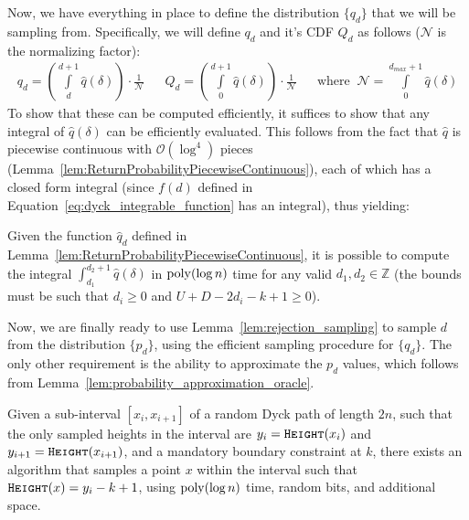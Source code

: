 Now, we have everything in place to define the distribution $\{ q_d\}$ that we will be sampling from.
Specifically, we will define $q_d$ and it's CDF $Q_d$ as follows ($\mathcal N$ is the normalizing factor):
{\small
    \begin{align}
        q_d = \left(\int\limits_d^{d+1} \hat q(\delta)\right)\cdot \frac{1}{\mathcal N}
        && Q_d = \left(\int\limits_0^{d+1} \hat q(\delta)\right)\cdot \frac{1}{\mathcal N}
        && \textrm{where }\ \mathcal N = \int\limits_0^{d_{max}+1} \hat q(\delta)
    \end{align}}
To show that these can be computed efficiently, it suffices to show that any integral of $\hat q(\delta)$ can be efficiently evaluated.
This follows from the fact that $\hat q$ is piecewise continuous with $\mathcal O(\log^4)$ pieces (Lemma~\ref{lem:ReturnProbabilityPiecewiseContinuous}),
each of which has a closed form integral (since $f(d)$ defined in Equation~\ref{eq:dyck_integrable_function} has an integral), thus yielding:
\begin{lemma}
\label{lem:ReturnProbabilityPiecewiseContinuousIntegral}
Given the function $\hat q_d$ defined in Lemma~\ref{lem:ReturnProbabilityPiecewiseContinuous},
it is possible to compute the integral $\int_{d_1}^{d_2+1} \hat q(\delta)$ in $\mathrm{poly}(\log n)$ time for any valid $d_1, d_2\in \mathbb Z$
(the bounds must be such that $d_i \ge 0$ and $U+D-2d_i-k+1 \ge 0$).
\end{lemma}

Now, we are finally ready to use Lemma~\ref{lem:rejection_sampling} to sample $d$ from the distribution $\{p_d\}$,
using the efficient sampling procedure for $\{q_d\}$.
The only other requirement is the ability to approximate the $p_d$ values, which follows from Lemma~\ref{lem:probability_approximation_oracle}.
\begin{theorem}
\label{thm:first_return_in_interval}
Given a sub-interval $[x_{i},x_{i+1}]$ of a random Dyck path of length $2n$,
such that the only sampled heights in the interval are $y_i=\texttt{\textsc{Height}}(x_i)$ and $y_{i+1}=\texttt{\textsc{Height}}(x_{i+1})$,
and a mandatory boundary constraint at $k$,
there exists an algorithm that samples a point $x$ within the interval such that $\texttt{\textsc{Height}}(x) = y_i-k+1$,
using $\mathrm{poly}(\log n)$ time, random bits, and additional space.
\end{theorem}




